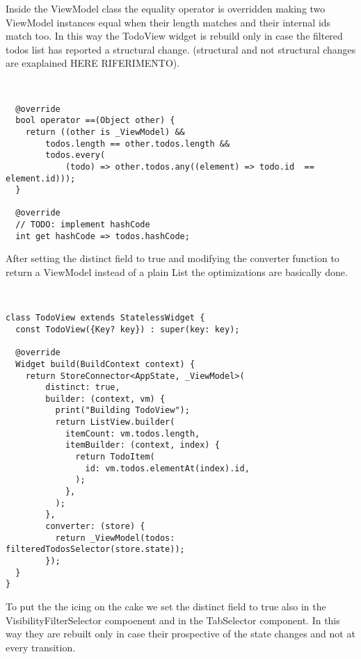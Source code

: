  Inside the ViewModel class the equality operator is overridden making two ViewModel instances equal when their length matches and their internal ids match too. In this way the TodoView widget is rebuild only in case the filtered todos list has reported a structural change. (structural and not structural changes are exaplained HERE RIFERIMENTO). 
\begin{code}
\mbox{}\\
 \mbox{}
		\label{code:2.14}
\begin{verbatim}
  @override
  bool operator ==(Object other) {
    return ((other is _ViewModel) &&
        todos.length == other.todos.length &&
        todos.every(
            (todo) => other.todos.any((element) => todo.id  == element.id)));
  }

  @override
  // TODO: implement hashCode
  int get hashCode => todos.hashCode;
\end{verbatim}
\mbox{}
\end{code}

After setting the distinct field to true and modifying the converter function to return a ViewModel instead of a plain List the optimizations are basically done.
\begin{code}
\mbox{}\\
 \mbox{}
		\label{code:2.14}
\begin{verbatim}
class TodoView extends StatelessWidget {
  const TodoView({Key? key}) : super(key: key);

  @override
  Widget build(BuildContext context) {
    return StoreConnector<AppState, _ViewModel>(
        distinct: true,
        builder: (context, vm) {
          print("Building TodoView");
          return ListView.builder(
            itemCount: vm.todos.length,
            itemBuilder: (context, index) {
              return TodoItem(
                id: vm.todos.elementAt(index).id,
              );
            },
          );
        },
        converter: (store) {
          return _ViewModel(todos: filteredTodosSelector(store.state));
        });
  }
}
\end{verbatim}
\mbox{}
\end{code}

To put the  the icing on the cake we set the distinct field to true also in the VisibilityFilterSelector compoenent and in the TabSelector component. In this way they are rebuilt only in case their prospective of the state changes and not at every transition.

